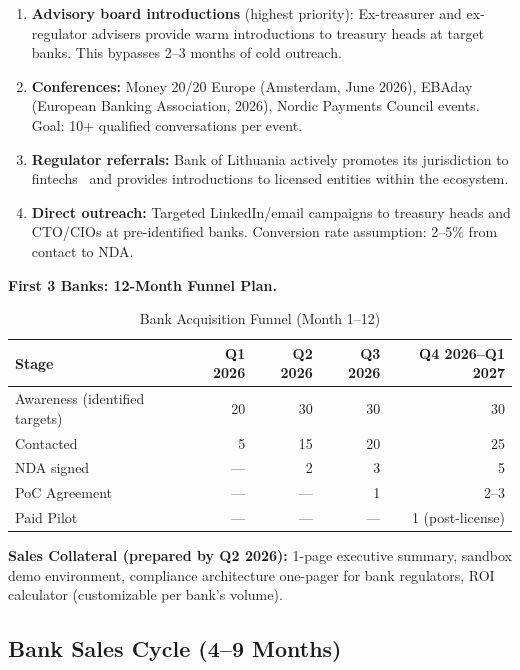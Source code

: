 \documentclass[11pt,a4paper]{article}
\begin{document}
\begin{enumerate}[leftmargin=2em, itemsep=4pt, parsep=0pt]
\item \textbf{Advisory board introductions} (highest priority): Ex-treasurer and ex-regulator advisers provide warm introductions to treasury heads at target banks. This bypasses 2--3 months of cold outreach.
\item \textbf{Conferences:} Money 20/20 Europe (Amsterdam, June 2026), EBAday (European Banking Association, 2026), Nordic Payments Council events. Goal: 10+ qualified conversations per event.
\item \textbf{Regulator referrals:} Bank of Lithuania actively promotes its jurisdiction to fintechs~\cite{lb_emi} and provides introductions to licensed entities within the ecosystem.
\item \textbf{Direct outreach:} Targeted LinkedIn/email campaigns to treasury heads and CTO/CIOs at pre-identified banks. Conversion rate assumption: 2--5\% from contact to NDA.
\end{enumerate}

\textbf{First 3 Banks: 12-Month Funnel Plan.}

\begin{table}[htbp]
\centering
\caption{Bank Acquisition Funnel (Month 1--12)}
\begin{tabularx}{\linewidth}{@{}Lrrrr@{}}
\toprule
\textbf{Stage} & \textbf{Q1 2026} & \textbf{Q2 2026} & \textbf{Q3 2026} & \textbf{Q4 2026--Q1 2027} \\
\midrule
Awareness (identified targets)   & 20  & 30  & 30  & 30 \\
Contacted                        & 5   & 15  & 20  & 25 \\
NDA signed                       & --- & 2   & 3   & 5  \\
PoC Agreement                    & --- & --- & 1   & 2--3 \\
Paid Pilot                       & --- & --- & --- & 1 (post-license) \\
\bottomrule
\end{tabularx}
\end{table}

\textbf{Sales Collateral (prepared by Q2 2026):} 1-page executive summary, sandbox demo environment, compliance architecture one-pager for bank regulators, ROI calculator (customizable per bank's volume).

\subsection*{Bank Sales Cycle (4--9 Months)}
\end{document}
